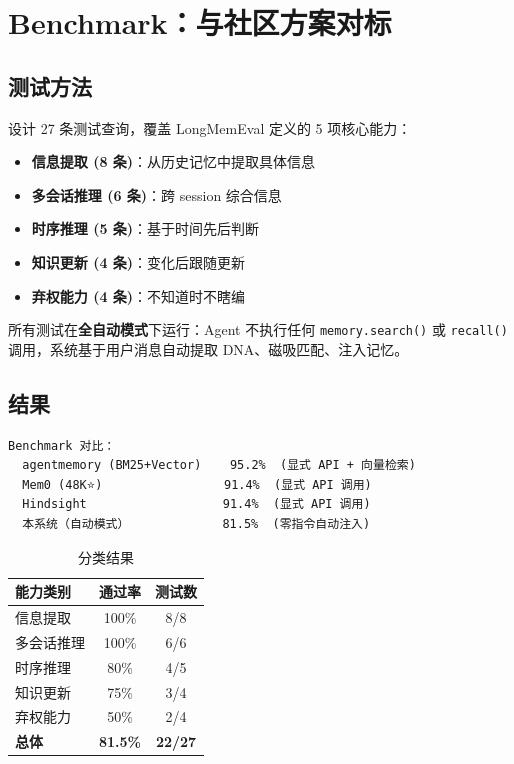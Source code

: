 \documentclass[11pt,a4paper]{article}
\begin{document}
\section{Benchmark：与社区方案对标}

\subsection{测试方法}
设计 27 条测试查询，覆盖 LongMemEval 定义的 5 项核心能力：

\begin{itemize}
  \item \textbf{信息提取 (8 条)}：从历史记忆中提取具体信息
  \item \textbf{多会话推理 (6 条)}：跨 session 综合信息
  \item \textbf{时序推理 (5 条)}：基于时间先后判断
  \item \textbf{知识更新 (4 条)}：变化后跟随更新
  \item \textbf{弃权能力 (4 条)}：不知道时不瞎编
\end{itemize}

所有测试在\textbf{全自动模式}下运行：Agent 不执行任何 \texttt{memory.search()} 或 \texttt{recall()} 调用，系统基于用户消息自动提取 DNA、磁吸匹配、注入记忆。

\subsection{结果}

\begin{verbatim}
Benchmark 对比：
  agentmemory (BM25+Vector)    95.2%  (显式 API + 向量检索)
  Mem0 (48K⭐)                 91.4%  (显式 API 调用)
  Hindsight                   91.4%  (显式 API 调用)
  本系统（自动模式）             81.5%  (零指令自动注入)
\end{verbatim}

\begin{table}[ht]
\centering
\caption{分类结果}
\label{tab:results}
\begin{tabular}{lcc}
\toprule
能力类别 & 通过率 & 测试数 \\
\midrule
信息提取 & 100\% & 8/8 \\
多会话推理 & 100\% & 6/6 \\
时序推理 & 80\% & 4/5 \\
知识更新 & 75\% & 3/4 \\
弃权能力 & 50\% & 2/4 \\
\midrule
\textbf{总体} & \textbf{81.5\%} & \textbf{22/27} \\
\bottomrule
\end{tabular}
\end{table}
\end{document}
